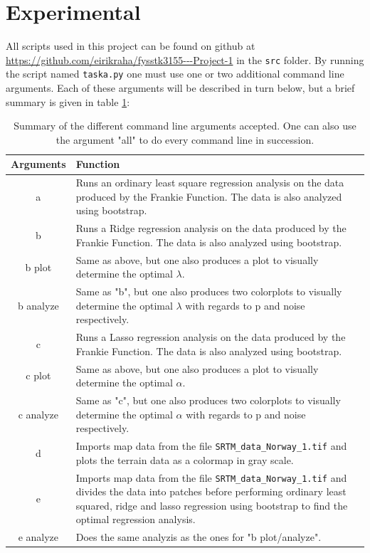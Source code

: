 \documentclass[12pt]{article}
\begin{document}
\section{Experimental}   \label{s:e}
All scripts used in this project can be found on github at \url{https://github.com/eirikraha/fysstk3155---Project-1} in the \texttt{src} folder. By running the script named \texttt{taska.py} one must use one or two additional command line arguments. Each of these arguments will be described in turn below, but a brief summary is given in table \ref{tabE:sum}:
\begin{table}[H]
\centering
\begin{tabular}{c|p{12cm}}
\textbf{Arguments} & \textbf{Function} \\ \hline
a & Runs an ordinary least square regression analysis on the data produced by the Frankie Function. The data is also analyzed using bootstrap. \\ \hline
b & Runs a Ridge regression analysis on the data produced by the Frankie Function. The data is also analyzed using bootstrap. \\ \hline
b plot & Same as above, but one also produces a plot to visually determine the optimal $\lambda$. \\ \hline
b analyze & Same as "b", but one also produces two colorplots to visually determine the optimal $\lambda$ with regards to p and noise respectively. \\ \hline
c & Runs a Lasso regression analysis on the data produced by the Frankie Function. The data is also analyzed using bootstrap. \\ \hline
c plot & Same as above, but one also produces a plot to visually determine the optimal $\alpha$. \\ \hline
c analyze & Same as "c", but one also produces two colorplots to visually determine the optimal $\alpha$ with regards to p and noise respectively. \\ \hline
d & Imports map data from the file \texttt{SRTM\_data\_Norway\_1.tif} and plots the terrain data as a colormap in gray scale. \\ \hline
e & Imports map data from the file \texttt{SRTM\_data\_Norway\_1.tif} and divides the data into patches before performing ordinary least squared, ridge and lasso regression using bootstrap to find the optimal regression analysis. \\ \hline
e analyze & Does the same analyzis as the ones for "b plot/analyze". 
\end{tabular}
\caption{Summary of the different command line arguments accepted. One can also use the argument "all" to do every command line in succession.}
\label{tabE:sum}
\end{table}
\end{document}

